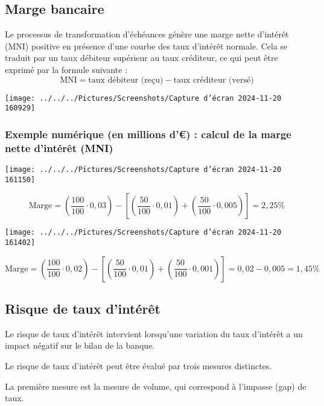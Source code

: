 \documentclass[a4paper, 12pt]{report}
\begin{document}
\subsection{Marge bancaire}

Le processus de transformation d'échéances génère une marge nette d'intérêt (MNI) positive en présence d'une courbe des taux d'intérêt normale. Cela se traduit par un taux débiteur supérieur au taux créditeur, ce qui peut être exprimé par la formule suivante :
\[
\text{MNI} = \text{taux débiteur (reçu)} - \text{taux créditeur (versé)}
\]

\begin{center}
	\texttt{[image: ../../../Pictures/Screenshots/Capture d'écran 2024-11-20 160929]}
\end{center}

\subsubsection{Exemple numérique (en millions d’€) : calcul de la marge nette d’intérêt (MNI)}

\begin{center}
	\texttt{[image: ../../../Pictures/Screenshots/Capture d'écran 2024-11-20 161150]}
\end{center}
\[
\text{Marge} = \left( \frac{100}{100} \cdot 0,03 \right) - \left[ \left( \frac{50}{100} \cdot 0,01 \right) + \left( \frac{50}{100} \cdot 0,005 \right) \right] = 2,25\%
\]
\begin{center}
	\texttt{[image: ../../../Pictures/Screenshots/Capture d'écran 2024-11-20 161402]}
\end{center}
\[
\text{Marge} = \left( \frac{100}{100} \cdot 0,02 \right) - \left[ \left( \frac{50}{100} \cdot 0,01 \right) + \left( \frac{50}{100} \cdot 0,001 \right) \right] = 0,02 - 0,005 = 1,45\%
\]

\subsection{Risque de taux d’intérêt}

Le risque de taux d'intérêt intervient lorsqu'une variation du taux d'intérêt a un impact négatif sur le bilan de la banque. 

Le risque de taux d'intérêt peut être évalué par trois mesures distinctes. 

La première mesure est la mesure de volume, qui correspond à l'impasse (gap) de taux. 
\end{document}
